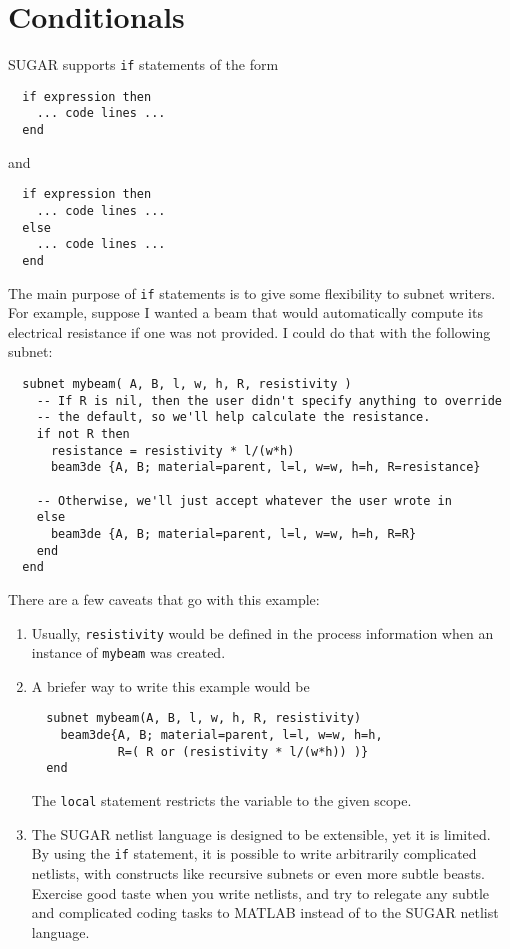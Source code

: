 \section{Conditionals}

SUGAR supports \texttt{if} statements of the form
\begin{verbatim}
  if expression then
    ... code lines ...
  end
\end{verbatim}
and
\begin{verbatim}
  if expression then
    ... code lines ...
  else
    ... code lines ...
  end
\end{verbatim}

The main purpose of \texttt{if} statements is to give some flexibility
to subnet writers.  For example, suppose I wanted a beam that would
automatically compute its electrical resistance if one was not provided.
I could do that with the following subnet:
\begin{verbatim}
  subnet mybeam( A, B, l, w, h, R, resistivity )
    -- If R is nil, then the user didn't specify anything to override
    -- the default, so we'll help calculate the resistance.
    if not R then
      resistance = resistivity * l/(w*h)
      beam3de {A, B; material=parent, l=l, w=w, h=h, R=resistance}

    -- Otherwise, we'll just accept whatever the user wrote in
    else 
      beam3de {A, B; material=parent, l=l, w=w, h=h, R=R}
    end
  end
\end{verbatim}

There are a few caveats that go with this example:
\begin{enumerate}
 \item
       Usually, \texttt{resistivity} would be defined in the process
       information when an instance of \texttt{mybeam} was created.
 \item 
      A briefer way to write this example would be
\begin{verbatim}
  subnet mybeam(A, B, l, w, h, R, resistivity)
    beam3de{A, B; material=parent, l=l, w=w, h=h, 
            R=( R or (resistivity * l/(w*h)) )}
  end
\end{verbatim}
    The \texttt{local} statement restricts the variable to the given scope.
 \item
    The SUGAR netlist language is designed to be extensible, yet it is limited.
    By using the \texttt{if} statement, it is possible to write arbitrarily 
    complicated netlists, with constructs
    like recursive subnets or even more subtle beasts.  Exercise good taste
    when you write netlists, and try to relegate any subtle and complicated
    coding tasks to MATLAB instead of to the SUGAR netlist language.
\end{enumerate}
